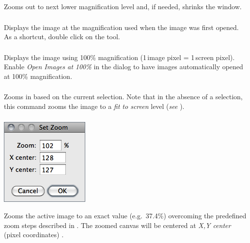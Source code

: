 Zooms out to next lower magnification level and, if needed, shrinks
the window. 


\subsubsection{\protect{}\label{sub:Original-Scale-[4]}}

Displays the image at the magnification used when the image was first
opened. As a shortcut, double click on the 
tool.


\subsubsection{\protect{}\label{sub:View-100=000025-[5]}}

Displays the image using 100\% magnification (1\,image pixel = 1\,screen
pixel). Enable \emph{Open Images at 100\%} in the 
dialog to have images automatically opened at 100\% magnification. 


\subsubsection{\protect{}\label{sub:ZoomToSelection}}

Zooms in based on the current selection. Note that in the absence
of a selection, this command zooms the image to a \emph{fit to screen}
level (\emph{see} ). 


\subsubsection[\protect\userinterface{Set\ldots{}}]{\protect{}\label{sub:Set-Zoom...}}

\begin{minipage}[c][1\totalheight][t]{0.26\columnwidth}%
\includegraphics[scale=0.55]{images/SetZoom}%
\end{minipage}%
\begin{minipage}[c][1\totalheight][t]{0.74\columnwidth}%
Zooms the active image to an exact value (e.g.\ 37.4\%) overcoming
the predefined zoom steps described in .
The zoomed canvas will be centered at \emph{X,Y center} (pixel coordinates)
\cite{C-SetZoom}.%
\end{minipage}


